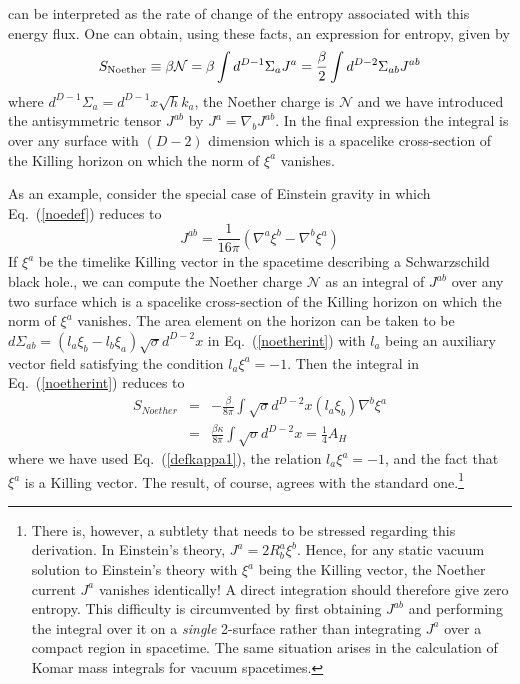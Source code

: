 \documentclass[12pt]{iopart}
\def\eq#1{{Eq.~(\ref{#1})}}
\begin{document}
can be interpreted as the rate of change of the entropy associated with this energy flux.
 One can obtain, using these facts, an
 expression for entropy,  given by
\begin{equation}
S_{\rm Noether} \equiv \beta \mathcal{N} = \beta\int d^{D-1}\Sigma_{a} J^{a}= \frac{\beta}{2}  \int d^{D-2}\Sigma_{ab} J^{ab}
\label{noetherint}
\end{equation} 
where $ d^{D-1}\Sigma_{a} = d^{D-1} x \sqrt{h}  k_a$, the Noether charge is $\mathcal{N}$
 and we have  introduced the antisymmetric tensor $J^{ab}$ by $J^a = \nabla_b J^{ab}$.
 In the final expression the integral is over any surface with $(D-2)$ dimension which is a spacelike cross-section of the Killing horizon on which the norm of $\xi^a$ vanishes.
 


As an example, consider  the special case of  Einstein gravity in which \eq{noedef}  reduces to
\begin{equation}
J^{ab} = \frac{1}{16\pi} \left( \nabla^a \xi^b - \nabla^b \xi^a\right)
\end{equation}
If $\xi^a$ be  the timelike Killing vector in the  spacetime describing  a Schwarzschild black hole., we can compute the Noether charge $\mathcal{N}$  as an integral of $J^{ab}$  over any
two surface  which is a spacelike cross-section of the Killing horizon on which 
the norm of $\xi^a$ vanishes. The area element on the horizon can be taken to be  $d\Sigma_{ab}=  (l_a\xi_b-l_b\xi_a)\sqrt{\sigma}d^{D-2}x$ in \eq{noetherint} with $l_a$ being an auxiliary vector field satisfying the condition $l_a\xi^a=-1$. Then the integral in \eq{noetherint} reduces to
\begin{eqnarray}
 S_{Noether}&=& -\frac{\beta}{8\pi}\int\sqrt{\sigma}d^{D-2}x
 (l_a\xi_b)\nabla^b \xi^a\nonumber\\
 &=&\frac{\beta\kappa}{8\pi}\int\sqrt{\sigma}d^{D-2}x
 =\frac{1}{4}A_H
\end{eqnarray} 
where we have used \eq{defkappa1}, the relation $l_a\xi^a=-1$, and the fact that $\xi^a$ is a Killing vector. The result, of course, agrees with the standard one.\footnote{There is, however, a subtlety that needs to be stressed regarding this derivation. In Einstein's theory, $J^a = 2 R^a_b \xi^b$. Hence, for  any static vacuum solution to Einstein's theory with $\xi^a$ being the Killing vector, the Noether current $J^a$ vanishes identically! A direct integration should therefore give zero entropy. This difficulty is circumvented by first obtaining $J^{ab}$ and performing the integral over it on a \textit{single} 2-surface rather than integrating $J^a $ over a compact region in spacetime. The same situation arises in the calculation of Komar mass integrals for vacuum spacetimes.}
\end{document}
